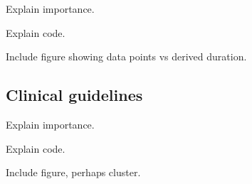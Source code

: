 \documentclass{elsart}
\begin{document}
Explain importance.

Explain code.

Include figure showing data points vs derived duration.

\subsection{Clinical guidelines}

Explain importance.

Explain code.

Include figure, perhaps cluster.





\end{document}
